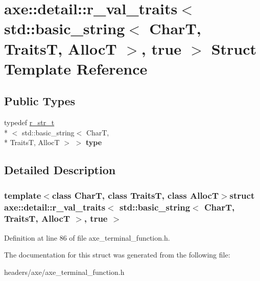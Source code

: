 \hypertarget{structaxe_1_1detail_1_1r__val__traits_3_01std_1_1basic__string_3_01CharT_00_01TraitsT_00_01AllocT_01_4_00_01true_01_4}{\section{axe\+:\+:detail\+:\+:r\+\_\+val\+\_\+traits$<$ std\+:\+:basic\+\_\+string$<$ Char\+T, Traits\+T, Alloc\+T $>$, true $>$ Struct Template Reference}
\label{structaxe_1_1detail_1_1r__val__traits_3_01std_1_1basic__string_3_01CharT_00_01TraitsT_00_01AllocT_01_4_00_01true_01_4}
}
\subsection*{Public Types}
\begin{DoxyCompactItemize}
\item 
\hypertarget{structaxe_1_1detail_1_1r__val__traits_3_01std_1_1basic__string_3_01CharT_00_01TraitsT_00_01AllocT_01_4_00_01true_01_4_a1191050d20819040f9a0657bfc725649}{typedef \hyperlink{classaxe_1_1r__str__t}{r\+\_\+str\+\_\+t}\\*
$<$ std\+::basic\+\_\+string$<$ Char\+T, \\*
Traits\+T, Alloc\+T $>$ $>$ {\bfseries type}}\label{structaxe_1_1detail_1_1r__val__traits_3_01std_1_1basic__string_3_01CharT_00_01TraitsT_00_01AllocT_01_4_00_01true_01_4_a1191050d20819040f9a0657bfc725649}

\end{DoxyCompactItemize}


\subsection{Detailed Description}
\subsubsection*{template$<$class Char\+T, class Traits\+T, class Alloc\+T$>$struct axe\+::detail\+::r\+\_\+val\+\_\+traits$<$ std\+::basic\+\_\+string$<$ Char\+T, Traits\+T, Alloc\+T $>$, true $>$}



Definition at line 86 of file axe\+\_\+terminal\+\_\+function.\+h.



The documentation for this struct was generated from the following file\+:\begin{DoxyCompactItemize}
\item 
headers/axe/axe\+\_\+terminal\+\_\+function.\+h\end{DoxyCompactItemize}
